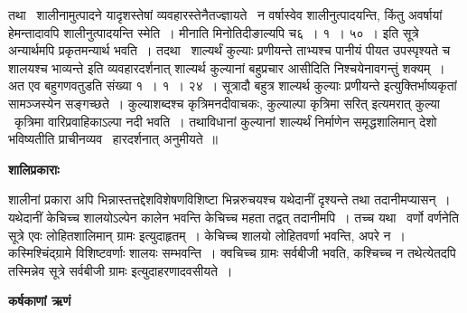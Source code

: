 \documentclass[11pt, openany]{book}
\begin{document}
तथा \textendash\ शालीनामुत्पादने यादृशस्तेषां व्यवहारस्तेनैतज्ज्ञायते \textendash\ न वर्षास्वेव शालीनुत्पादयन्ति, किंतु अवर्षायां हेमन्तादावपि शालीनुत्पादयन्ति स्मेति~। मीनाति मिनोतिदीङाल्यपि च६~। १~। ५०~। इति सूत्रे {\qt अन्यार्थमपि प्रकृतमन्यार्थ भवति~। तदथा \textendash\ शाल्यर्थं कुल्याः प्रणीयन्ते ताभ्यश्च पानीयं पीयत उपस्पृश्यते च शालयश्च भाव्यन्ते} इति व्यवहारदर्शनात् शाल्यर्थ कुल्यानां बहुप्रचार आसीदिति निश्चयेनावगन्तुं शक्यम्~। अत एव बहुगणवतुडति संख्या १~। १~। २४~। सूत्रादौ बहुत्र {\qt शाल्यर्थ कुल्याः प्रणीयन्ते} इत्युक्तिर्भाष्यकृतां सामञ्जस्येन सङ्गच्छते~। कुल्याशब्दश्च कृत्रिमनदीवाचकः, {\qt कुल्याल्पा कृत्रिमा सरित्} इत्यमरात् कुल्या \textendash\ कृत्रिमा वारिप्रवाहिकाऽल्पा नदी भवति~। तथाविधानां कुल्यानां शाल्यर्थं निर्माणेन समृद्धशालिमान् देशो भविष्यतीति प्राचीनव्यव \textendash\ हारदर्शनात् अनुमीयते~॥

\begin{center}
\textbf{\Large शालिप्रकाराः \textendash\ }
\end{center}

शालीनां प्रकारा अपि भिन्नास्तत्तद्देशविशेषणविशिष्टा भिन्नरुचयश्च यथेदानीं दृश्यन्ते तथा तदानीमप्यासन्~। यथेदानीं केचिच्च शालयोऽल्पेन कालेन भवन्ति केचिच्च महता तद्वत् तदानीमपि~। तच्च यथा \textendash\ वर्णो वर्णनेति सूत्रे एवः लोहितशालिमान् ग्रामः इत्युदाहृतम्~। केचिच्च शालयो लोहितवर्णा भवन्ति, अपरे न~। कस्मिश्चिंद्ग्रामे विशिष्टवर्णाः शालयः सम्भवन्ति~। क्वचिच्च ग्रामः सर्वबीजी भवति, कश्चिच्च न तथेत्येतदपि तस्मिन्नेव सूत्रे सर्वबीजी ग्रामः इत्युदाहरणादवसीयते~।

\begin{center}
\textbf{\Large कर्षकाणां ऋणं }
\end{center}
\end{document}
